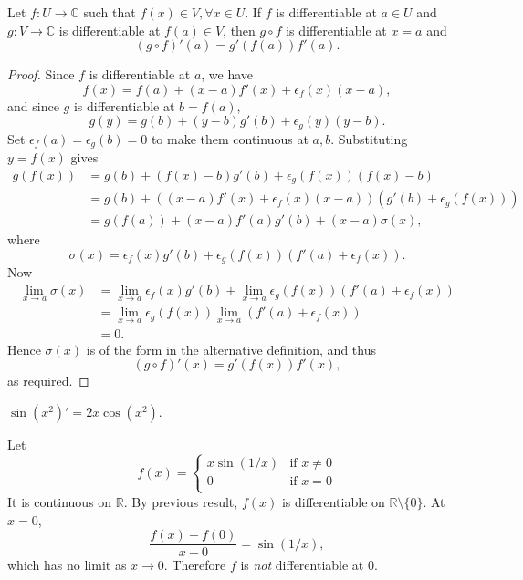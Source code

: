\begin{theorem}\label{thm:Chain rule}
    Let $ f:U\to \mathbb{C}  $ such that $ f(x)\in V,\forall x\in U $. If $f$ is differentiable at $a\in U$ and $ g:V\to \mathbb{C} $ is differentiable at $f(a)\in V$, then $g\circ f$ is differentiable at $x=a$ and
    \[
        (g \circ f)'(a) = g'(f(a))f'(a).
    \]
\end{theorem}
\begin{proof}
    Since $f$ is differentiable at $a$, we have 
    \[
        f(x) = f(a) + (x-a) f'(x) +\epsilon_f(x)(x-a),
    \]
    and since $g$ is differentiable at $b=f(a)$, 
    \[
        g(y) = g(b) + (y-b) g'(b) + \epsilon_g(y) (y-b).
    \]
    Set $ \epsilon_f(a)=\epsilon_g(b)=0 $ to make them continuous at $a,b$. Substituting $y=f(x)$ gives 
    \begin{align*}
        g(f(x)) &= g(b) + (f(x)-b)g'(b)+\epsilon_g(f(x))(f(x)-b)\\ 
        &= g(b) + ((x-a)f'(x)+\epsilon_f(x)(x-a))(g'(b)+\epsilon_g(f(x))) \\ 
        &= g(f(a)) + (x-a) f'(a)g'(b)+(x-a)\sigma(x),
    \end{align*} 
    where
    \[
        \sigma(x) = \epsilon_f(x)g'(b)+\epsilon_g(f(x))(f'(a)+\epsilon_f(x)).
    \]
    Now 
    \begin{align*}
        \lim_{x \to a} \sigma(x) &= \lim_{x \to a}\epsilon_f(x)g'(b)+\lim_{x \to a}\epsilon_g(f(x))(f'(a)+\epsilon_f(x))\\ 
        &=\lim_{x \to a}\epsilon_g(f(x))\lim_{x \to a}(f'(a)+\epsilon_f(x))\\ 
        &= 0.
    \end{align*}
    Hence $ \sigma(x) $ is of the form in the alternative definition, and thus 
    \[
        (g \circ f)'(x)=g'(f(x))f'(x),
    \]
    as required.
\end{proof}
\begin{example}
    $ \sin (x^2)'=2x \cos (x^2) $.
\end{example}
\begin{example}
    Let 
    \[
        f(x) = \begin{cases}
        x\sin(1/x) &\text{if }x\neq 0\\
        0 &\text{if }x=0\\
        \end{cases} 
    \]
    It is continuous on $\mathbb{R}$. By previous result, $f(x)$ is differentiable on $ \mathbb{R}\setminus \{0\} $. At $x=0$, 
    \[
        \frac{f(x)-f(0)}{x-0} = \sin (1/x),
    \]
    which has no limit as $ x\to 0 $. Therefore $f$ is \textit{not} differentiable at $0$.
\end{example}
